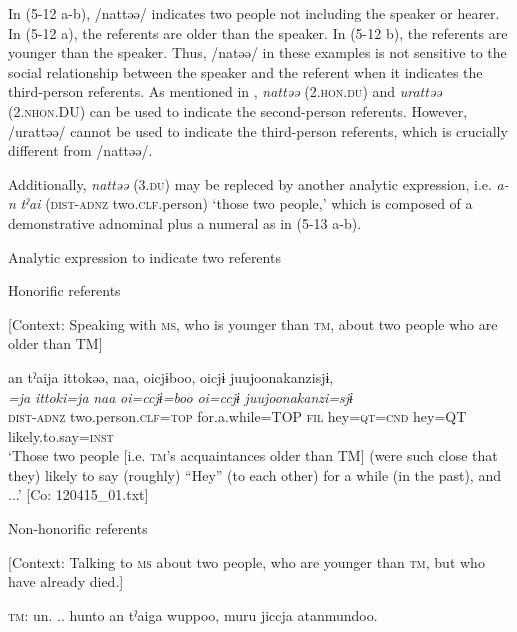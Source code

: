 In (5-12 a-b), /nattəə/ indicates two people not including the speaker or hearer. In (5-12 a), the referents are older than the speaker. In (5-12 b), the referents are younger than the speaker. Thus, /natəə/ in these examples is not sensitive to the social relationship between the speaker and the referent when it indicates the third-person referents. As mentioned in , \textit{nattəə} (2.\textsc{hon}.\textsc{du}) and \textit{urattəə} (2.\textsc{nhon}.DU) can be used to indicate the second-person referents. However, /urattəə/ cannot be used to indicate the third-person referents, which is crucially different from /nattəə/.

Additionally, \textit{nattəə} (3.\textsc{du}) may be repleced by another analytic expression, i.e. \textit{a-n} \textit{tˀai} (\textsc{dist}-\textsc{adnz} two.\textsc{clf}.person) ‘those two people,’ which is composed of a demonstrative adnominal plus a numeral as in (5-13 a-b).

\ea \label{ex:5:13}   Analytic expression to indicate two referents

  \ea Honorific referents

  [Context: Speaking with \textsc{ms}, who is younger than \textsc{tm}, about two people who are older than TM]

\glll  an  tˀaija  ittokəə,  naa,  {\textbar}oi{\textbar}cjɨboo, {\textbar}oi{\textbar}cjɨ  {\textbar}juujoonakanzi{\textbar}sjɨ,\\
\textit{}  \textit{=ja}  \textit{ittoki=ja}  \textit{naa}  \textit{oi=ccjɨ=boo}  \textit{oi=ccjɨ}  \textit{juujoonakanzi=sjɨ}\\
\textsc{dist}-\textsc{adnz}  two.person.\textsc{clf}=\textsc{top}  for.a.while=TOP  \textsc{fil}  hey=\textsc{qt}=\textsc{cnd}  hey=QT  likely.to.say=\textsc{inst}\\
\glt ‘Those two people [i.e. \textsc{tm}’s acquaintances older than TM] (were such close that they) likely to say (roughly) “Hey” (to each other) for a while (in the past), and ...’ [Co: 120415\_01.txt]

  \ex Non-honorific referents

  [Context: Talking to \textsc{ms} about two people, who are younger than \textsc{tm}, but who have already died.]

  \textsc{tm}:  un.  .. hunto  an  tˀaiga  wuppoo,  muru jiccja  atanmundoo.
                                                                                                  
